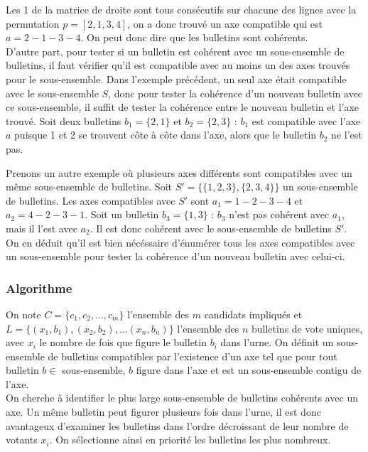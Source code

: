 \documentclass[11pt, a4paper]{article}
\begin{document}
Les 1 de la matrice de droite sont tous cons\'{e}cutifs sur chacune des lignes avec la permutation $p = [2,1,3,4]$, on a donc trouv\'{e} un axe compatible qui est $a = 2-1-3-4$. On peut donc dire que les bulletins sont coh\'{e}rents.\\

D'autre part, pour tester si un bulletin est coh\'{e}rent avec un sous-ensemble de bulletins, il faut v\'{e}rifier qu'il est compatible avec au moins un des axes trouv\'{e}s pour le sous-ensemble. Dans l'exemple pr\'{e}c\'{e}dent, un seul axe \'{e}tait compatible avec le sous-ensemble $S$, donc pour tester la coh\'{e}rence d'un nouveau bulletin avec ce sous-ensemble, il suffit de tester la coh\'{e}rence entre le nouveau bulletin et l'axe trouv\'{e}. Soit deux bulletins $b_{1} = \{2,1\}$ et $b_{2} = \{2,3\}$ : $b_{1}$ est compatible avec l'axe $a$ puisque 1 et 2 se trouvent c\^{o}te \`{a} c\^{o}te dans l'axe, alors que le bulletin $b_{2}$ ne l'est pas.

Prenons un autre exemple où plusieurs axes diff\'{e}rents sont compatibles avec un même sous-ensemble de bulletins. Soit $S' = \{\{1,2,3\}, \{2,3,4\}\}$ un sous-ensemble de bulletins. Les axes compatibles avec $S'$ sont $a_{1} = 1-2-3-4$ et $a_{2} = 4-2-3-1$. Soit un bulletin $b_{3} = \{1,3\}$ : $b_{3}$ n'est pas coh\'{e}rent avec $a_{1}$, mais il l'est avec $a_{2}$. Il est donc coh\'{e}rent avec le sous-ensemble de bulletins $S'$.\\

On en d\'{e}duit qu'il est bien n\'{e}c\'{e}ssaire d'\'{e}num\'{e}rer tous les axes compatibles avec un sous-ensemble pour tester la coh\'{e}rence d'un nouveau bulletin avec celui-ci.

\subsubsection{Algorithme}

On note $C = \{c_{1}, c_{2}, ..., c_{m}\}$ l'ensemble des $m$ candidats impliqu\'{e}s et $L = \{(x_{1}, b_{1}), (x_{2}, b_{2}), ... (x_{n}, b_{n})\}$ l'ensemble des $n$ bulletins de vote uniques, avec $x_{i}$ le nombre de fois que figure le bulletin $b_{i}$ dans l'urne. On définit un \og sous-ensemble de bulletins compatibles \fg{} par l'existence d'un axe tel que pour tout bulletin $b \in$ sous-ensemble, $b$ figure dans l'axe et est un sous-ensemble contigu de l'axe.\\

On cherche \`{a} identifier le plus large sous-ensemble de bulletins coh\'{e}rents avec un axe. Un m\^{e}me bulletin peut figurer plusieurs fois dans l'urne, il est donc avantageux d'examiner les bulletins dans l'ordre d\'{e}croissant de leur nombre de votants $x_{i}$. On s\'{e}lectionne ainsi en priorit\'{e} les bulletins les plus nombreux.\\
\end{document}

